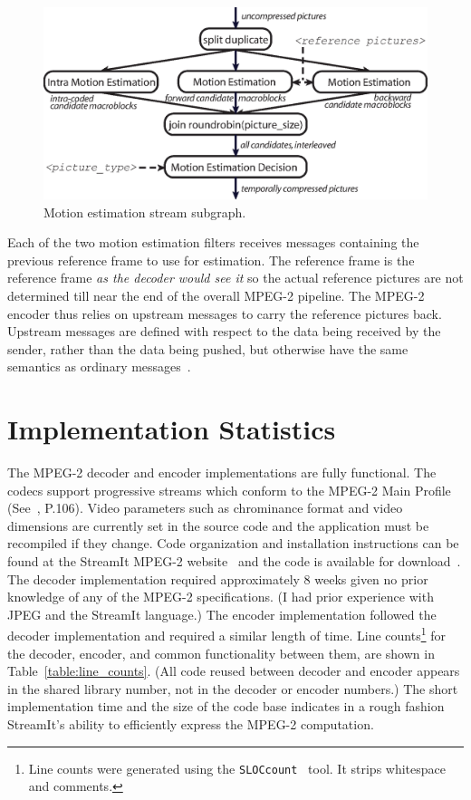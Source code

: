 \begin{figure}[h]
  \begin{center}
    \includegraphics[scale=0.6, angle=0]{./motion_estimation.eps}
    \caption{Motion estimation stream subgraph.}
    \label{fig:motion_estimation_subgraph}
  \end{center}
\end{figure}

Each of the two motion estimation filters receives messages 
containing the previous reference frame to use for estimation. 
The reference frame is the reference 
frame {\em as the decoder would see it} so the actual 
reference pictures are not determined till near the end of the 
overall MPEG-2 pipeline. The MPEG-2 encoder thus relies on 
upstream messages to carry the reference pictures back. 
Upstream messages are defined with respect to the data being 
received by the sender, rather than the data being pushed, 
but otherwise have the same semantics as ordinary 
messages~\cite{thies05ppopp}.

\section{Implementation Statistics}
\label{section:first_decoder_impl}

The MPEG-2 decoder and encoder implementations are fully functional. 
The codecs support progressive streams which conform to the MPEG-2 Main 
Profile (See~\cite{MPEG2}, P.106). Video parameters such as chrominance 
format and video dimensions are currently set in the source code and the 
application must be recompiled if they change. Code organization and 
installation instructions can be found at the StreamIt MPEG-2 
website~\cite{mpeg-streamit-website} and the code is available 
for download~\cite{mpeg-streamit-download}. The decoder 
implementation required approximately 8 weeks given no prior knowledge 
of any of the MPEG-2 specifications. (I had prior experience with JPEG 
and the StreamIt language.) The encoder implementation followed the 
decoder implementation and required a similar length of time. 
Line counts\footnote{Line 
counts were generated using the \texttt{SLOCcount}~\cite{sloccount} tool. 
It strips whitespace and comments.}
 for the decoder, encoder, and common functionality 
between them, are shown in Table~\ref{table:line_counts}. (All code reused between decoder and 
encoder appears in the shared library number, not in the decoder or encoder 
numbers.) The short implementation time and the size of the code base 
indicates in a rough fashion StreamIt's ability to efficiently express 
the MPEG-2 computation.

